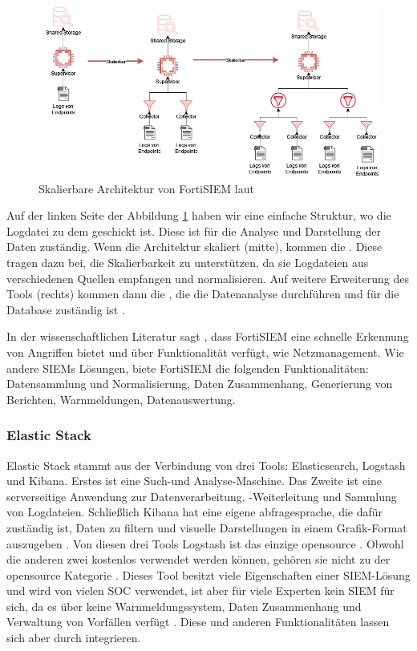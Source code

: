 \begin{figure}[H]
   \centering
   \includegraphics[width=1\textwidth]{assets/FortSIEM.drawio.png}
   \caption[Skalierbare Architektur von FortiSIEM]
   {Skalierbare Architektur von FortiSIEM laut \cite{Fortinet_Arch} }
   \label{fig:FortiSIEM}
   \centering
\end{figure}

Auf der linken Seite der Abbildung \ref{fig:FortiSIEM} haben wir eine einfache Struktur, wo die Logdatei zu dem  geschickt ist. Diese ist für die Analyse und Darstellung der Daten zuständig. Wenn die Architektur skaliert (mitte), kommen die . Diese tragen dazu bei, die Skalierbarkeit zu unterstützen, da sie Logdateien aus verschiedenen Quellen empfangen und normalisieren. Auf weitere Erweiterung des Tools (rechts) kommen dann die , die die Datenanalyse durchführen und für die Database zuständig ist \citep{Fortinet_Key}.

In der wissenschaftlichen Literatur sagt \cite{Ramires_fortsiem}, dass FortiSIEM eine schnelle Erkennung von Angriffen bietet und über  Funktionalität verfügt, wie Netzmanagement. Wie andere \glspl{SIEM} Lösungen, biete FortiSIEM die folgenden Funktionalitäten: Datensammlung und Normalisierung, Daten Zusammenhang, Generierung von Berichten, Warnmeldungen, Datenauswertung.


\subsubsection{Elastic Stack}
Elastic Stack stammt aus der Verbindung von drei Tools: Elasticsearch, Logstash und Kibana. Erstes ist eine Such-und Analyse-Maschine. Das Zweite ist eine serverseitige Anwendung zur Datenverarbeitung, -Weiterleitung und Sammlung von Logdateien. Schließlich Kibana \label{kibana} hat eine eigene \gls{abfragesprache}, die dafür zuständig ist, Daten zu filtern und visuelle Darstellungen in einem Grafik-Format auszugeben \citep{packt_elkstack}. Von diesen drei Tools Logstash ist das einzige \gls{opensource} \citep{elastic_OSI}. Obwohl die anderen zwei kostenlos verwendet werden können, gehören sie nicht zu der \gls{opensource} Kategorie \citep{OpenSource_Def}. Dieses Tool besitzt viele Eigenschaften einer \gls{SIEM}-Lösung und wird von vielen SOC verwendet, ist aber für viele Experten kein \gls{SIEM} für sich, da es über keine Warnmeldungssystem, Daten Zusammenhang und Verwaltung von Vorfällen verfügt \citep{Miller_ELK}. Diese und anderen Funktionalitäten lassen sich aber durch  integrieren.

